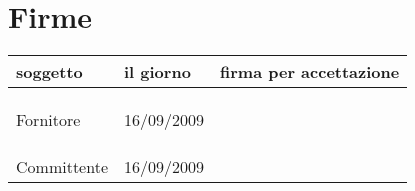 \documentclass[a4paper, 12pt]{report}
\begin{document}
\newpage

\section*{Firme}
\begin{table}[h!]
  \begin{center}
    \begin{tabular}{ l  l | p{60mm} }
    \textbf{soggetto} & \textbf{il giorno} & \textbf{firma per accettazione} \\
	\hline    
	\\\\\\
	Fornitore & 16/09/2009 &  \\
	\hline\\\\\\
	Committente & 16/09/2009 &  \\
    \hline
    \end{tabular}
  \end{center}
\end{table}
\newpage
\end{document}
